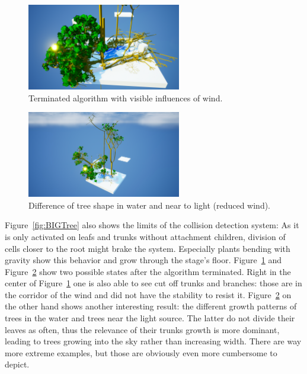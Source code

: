 \documentclass[11pt, abstract=on]{scrartcl}
\begin{document}
\begin{figure}
 	 \centering
 	    \includegraphics[width=0.6\textwidth]{SS_StageWithWind.png}
 	 \caption{Terminated algorithm with visible influences of wind.}
 	 \label{fig:StageWind}
\end{figure}

\begin{figure}
 	 \centering
 	    \includegraphics[width=0.6\textwidth]{SS_StageTallTrees.png}
 	 \caption{Difference of tree shape in water and near to light (reduced wind).}
 	 \label{fig:StageTallTrees}
\end{figure}

Figure~\ref{fig:BIGTree} also shows the limits of the collision detection system: As it is only activated on leafs and trunks without attachment children, division of cells closer to the root might brake the system. Especially plants bending with gravity show this behavior and grow through the stage's floor. Figure~\ref{fig:StageWind} and Figure~\ref{fig:StageTallTrees} show two possible states after the algorithm terminated. Right in the center of Figure~\ref{fig:StageWind} one is also able to see cut off trunks and branches: those are in the corridor of the wind and did not have the stability to resist it. Figure~\ref{fig:StageTallTrees} on the other hand shows another interesting result: the different growth patterns of trees in the water and trees near the light source. The latter do not divide their leaves as often, thus the relevance of their trunks growth is more dominant, leading to trees growing into the sky rather than increasing width. There are way more extreme examples, but those are obviously even more cumbersome to depict.
\end{document}
